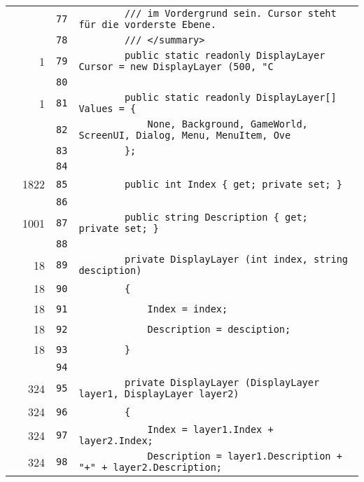 \documentclass[a4paper,10pt]{article}
\begin{document}
\begin{longtable}[l]{lrrl}
\cellcolor{gray} &  & \verb~77~ & \verb~        /// im Vordergrund sein. Cursor steht für die vorderste Ebene.~\\
\cellcolor{gray} &  & \verb~78~ & \verb~        /// </summary>~\\
\cellcolor{green} & 1 & \verb~79~ & \verb~        public static readonly DisplayLayer Cursor = new DisplayLayer (500, "C~\\
\cellcolor{gray} &  & \verb~80~ & \verb~~\\
\cellcolor{green} & 1 & \verb~81~ & \verb~        public static readonly DisplayLayer[] Values = {~\\
\cellcolor{gray} &  & \verb~82~ & \verb~            None, Background, GameWorld, ScreenUI, Dialog, Menu, MenuItem, Ove~\\
\cellcolor{gray} &  & \verb~83~ & \verb~        };~\\
\cellcolor{gray} &  & \verb~84~ & \verb~~\\
\cellcolor{green} & 1822 & \verb~85~ & \verb~        public int Index { get; private set; }~\\
\cellcolor{gray} &  & \verb~86~ & \verb~~\\
\cellcolor{green} & 1001 & \verb~87~ & \verb~        public string Description { get; private set; }~\\
\cellcolor{gray} &  & \verb~88~ & \verb~~\\
\cellcolor{green} & 18 & \verb~89~ & \verb~        private DisplayLayer (int index, string desciption)~\\
\cellcolor{green} & 18 & \verb~90~ & \verb~        {~\\
\cellcolor{green} & 18 & \verb~91~ & \verb~            Index = index;~\\
\cellcolor{green} & 18 & \verb~92~ & \verb~            Description = desciption;~\\
\cellcolor{green} & 18 & \verb~93~ & \verb~        }~\\
\cellcolor{gray} &  & \verb~94~ & \verb~~\\
\cellcolor{green} & 324 & \verb~95~ & \verb~        private DisplayLayer (DisplayLayer layer1, DisplayLayer layer2)~\\
\cellcolor{green} & 324 & \verb~96~ & \verb~        {~\\
\cellcolor{green} & 324 & \verb~97~ & \verb~            Index = layer1.Index + layer2.Index;~\\
\cellcolor{green} & 324 & \verb~98~ & \verb~            Description = layer1.Description + "+" + layer2.Description;~\\

\end{longtable}
\end{document}
